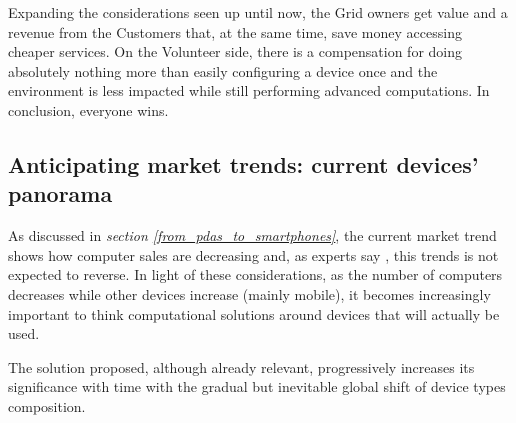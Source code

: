 Expanding the considerations seen up until now, the Grid owners get value and a revenue from the Customers that, at the same time, save money accessing cheaper services. On the Volunteer side, there is a compensation for doing absolutely nothing more than easily configuring a device once and the environment is less impacted while still performing advanced computations. In conclusion, everyone wins. 

\subsection{Anticipating market trends: current devices' panorama}
As discussed in \textit{section \ref{from_pdas_to_smartphones}}, the current market trend shows how computer sales are decreasing and, as experts say \cite{smartphones_sales}, this trends is not expected to reverse. In light of these considerations, as the number of computers decreases while other devices increase (mainly mobile), it becomes increasingly important to think computational solutions around devices that will actually be used.

The solution proposed, although already relevant, progressively increases its significance with time with the gradual but inevitable global shift of device types composition.
